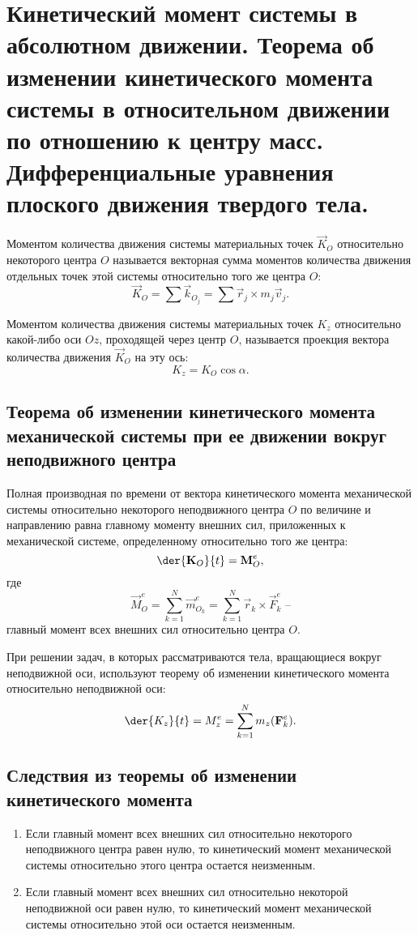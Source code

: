 \chapter{Кинетический момент системы в абсолютном движении. Теорема об
изменении кинетического момента системы в относительном движении по
отношению к центру масс. Дифференциальные уравнения плоского движения
твердого тела.}

Моментом количества движения системы материальных точек \( \vec{K}_O \)
относительно некоторого центра \( O \) называется векторная сумма моментов
количества движения отдельных точек этой системы относительно того же центра
\( O \):
\[
    \vec{K}_O = \sum \vec{k}_{O_j} = \sum \vec{r}_j\times m_j\vec{v}_j.
\]
 
Моментом количества движения системы материальных точек \( K_z \) относительно
какой-либо оси \( Oz \), проходящей через центр \( O \), называется проекция
вектора количества движения \( \vec{K}_O \) на эту ось:
\[
    K_z = K_O\cos\alpha.
\]

\section{Теорема об изменении кинетического момента механической системы при ее
движении вокруг неподвижного центра}
Полная производная по времени от вектора кинетического момента механической
системы относительно некоторого неподвижного центра \( O \) по величине и
направлению равна главному моменту внешних сил, приложенных к механической
системе, определенному относительно того же центра:
\[
    \der{\vec{K}_O}{t} = \vec{M}^e_O,
\]
где
\[
    \vec{M}^e_O = \sum_{k=1}^N \vec{m}^e_{O_k} = 
    \sum_{k=1}^N \vec{r}_k\times\vec{F}^e_k \text{ --}
\]
главный момент всех внешних сил относительно центра \( O \).

При  решении  задач, в которых рассматриваются тела, вращающиеся вокруг
неподвижной оси, используют теорему об изменении кинетического момента
относительно неподвижной оси:
\[
    \der{K_z}{t} = M^e_z = \sum_{k=1}^N m_z(\vec{F}^e_k).
\]
 
\section{Следствия из теоремы об изменении кинетического момента}
\begin{enumerate}
    \item Если главный момент всех внешних сил относительно некоторого
    неподвижного центра равен нулю, то кинетический момент механической системы
    относительно этого центра остается неизменным.
    \item Если главный момент всех внешних сил относительно некоторой
    неподвижной оси равен нулю, то кинетический момент механической системы
    относительно этой оси остается неизменным.
\end{enumerate}

